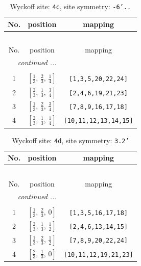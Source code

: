 \documentclass[fleqn,8pt]{jsarticle}
\begin{document}
\renewcommand{\arraystretch}{1.2}
\begin{longtable}{ccc}
\caption{Wyckoff site: {\tt 4c}, site symmetry: {\tt -6'..}}
 \\
 \hline \hline
No. & position & mapping \\ \hline \endfirsthead

\multicolumn{2}{l}{\tablename\ \thetable{}} \\
 \hline \hline
No. & position & mapping \\ \hline \endhead

 \hline \hline
\multicolumn{2}{r}{\footnotesize\it continued ...} \\ \endfoot

 \hline \hline
\multicolumn{2}{r}{} \\ \endlastfoot

1 & $\left[ \frac{1}{3},\, \frac{2}{3},\, \frac{1}{4} \right]$ & {\tt [1,3,5,20,22,24]} \\ \hline
2 & $\left[ \frac{2}{3},\, \frac{1}{3},\, \frac{3}{4} \right]$ & {\tt [2,4,6,19,21,23]} \\ \hline
3 & $\left[ \frac{1}{3},\, \frac{2}{3},\, \frac{3}{4} \right]$ & {\tt [7,8,9,16,17,18]} \\ \hline
4 & $\left[ \frac{2}{3},\, \frac{1}{3},\, \frac{1}{4} \right]$ & {\tt [10,11,12,13,14,15]} \\
\end{longtable}
\renewcommand{\arraystretch}{1.2}
\begin{longtable}{ccc}
\caption{Wyckoff site: {\tt 4d}, site symmetry: {\tt 3.2'}}
 \\
 \hline \hline
No. & position & mapping \\ \hline \endfirsthead

\multicolumn{2}{l}{\tablename\ \thetable{}} \\
 \hline \hline
No. & position & mapping \\ \hline \endhead

 \hline \hline
\multicolumn{2}{r}{\footnotesize\it continued ...} \\ \endfoot

 \hline \hline
\multicolumn{2}{r}{} \\ \endlastfoot

1 & $\left[ \frac{1}{3},\, \frac{2}{3},\, 0 \right]$ & {\tt [1,3,5,16,17,18]} \\ \hline
2 & $\left[ \frac{2}{3},\, \frac{1}{3},\, \frac{1}{2} \right]$ & {\tt [2,4,6,13,14,15]} \\ \hline
3 & $\left[ \frac{1}{3},\, \frac{2}{3},\, \frac{1}{2} \right]$ & {\tt [7,8,9,20,22,24]} \\ \hline
4 & $\left[ \frac{2}{3},\, \frac{1}{3},\, 0 \right]$ & {\tt [10,11,12,19,21,23]} \\
\end{longtable}
\end{document}
